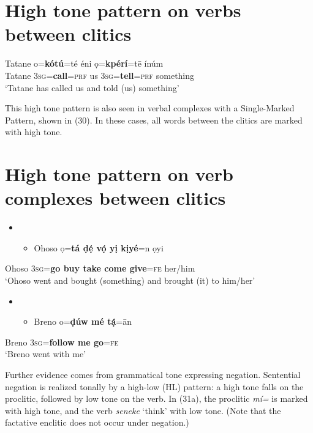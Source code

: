 \chapter[High tone pattern on verbs between clitics]{High tone pattern on verbs between clitics}
\label{bkm:Ref436500051}\gll Tatane  o=\textbf{kótú}=té     éni   ọ=\textbf{kpérí}=t\={e}     ínúm\\
     Tatane  3\textsc{sg}=\textbf{call}=\textsc{prf}\textbf{ }  us  \textbf{ }3\textsc{sg}=\textbf{tell}=\textsc{prf}  something\\
\glt ‘Tatane has called us and told (us) something’ \citep[285]{Kari2003a} 
\z

This high tone pattern is also seen in verbal complexes with a Single-Marked Pattern, shown in (30). In these cases, all words between the clitics are marked with high tone. 

\chapter[High tone pattern on verb complexes between clitics ]{High tone pattern on verb complexes between clitics }
\label{bkm:Ref449533464}\begin{itemize}
\item \setcounter{itemize}{0}
\begin{itemize}
\item \gll Ohoso   ọ=\textbf{tá  ḍẹ́    vọ́    yị    kịyé}=n   ọyi\\
\end{itemize}
\end{itemize}
     Ohoso    \textsc{3sg}=\textbf{go  buy    take  come  give}=\textsc{fe}   her/him\\
\glt ‘Ohoso went and bought (something) and brought (it) to him/her’ \citep[121]{Kari2004}
\z

\begin{itemize}
\item \setcounter{itemize}{0}
\begin{itemize}
\item \gll Breno   o=\textbf{ḍúw    mé   tạ́}=\={a}n\\
\end{itemize}
\end{itemize}
     Breno   3\textsc{sg}=\textbf{follow  me   go}=\textsc{fe}\\
\glt ‘Breno went with me’ \citep[115]{Kari2004}
\z

Further evidence comes from grammatical tone expressing negation. Sentential negation is realized tonally by a high-low (HL) pattern: a high tone falls on the proclitic, followed by low tone on the verb. In (31a), the proclitic \textit{mí=} is marked with high tone, and the verb \textit{seneke} ‘think’ with low tone. (Note that the factative enclitic does not occur under negation.)

